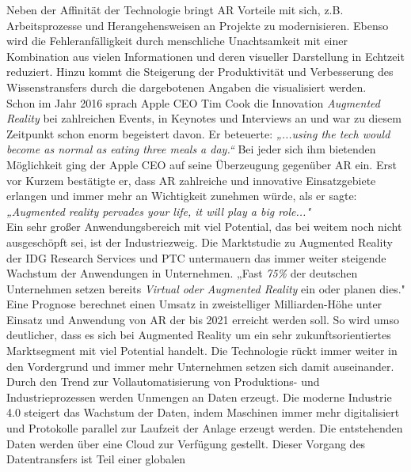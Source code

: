 Neben der Affinität der Technologie bringt \acs{AR} Vorteile mit sich, z.B. Arbeitsprozesse und Herangehensweisen an Projekte zu 
modernisieren. Ebenso wird die Fehleranfälligkeit durch menschliche Unachtsamkeit mit einer Kombination aus vielen Informationen und 
deren visueller Darstellung in Echtzeit reduziert. Hinzu kommt die Steigerung der Produktivität und Verbesserung des Wissenstransfers 
durch die dargebotenen Angaben die visualisiert werden.
\\ 
\linebreak
Schon im Jahr 2016 sprach Apple CEO Tim Cook die Innovation \textit{Augmented Reality} bei zahlreichen Events, in Keynotes und Interviews 
an und war zu diesem Zeitpunkt schon enorm begeistert davon. Er beteuerte: \textit{„...using the tech would become as normal as eating three 
meals a day.“} \cite{timcook2016.2016o} Bei jeder sich ihm bietenden Möglichkeit ging der Apple CEO auf seine Überzeugung gegenüber \acl{AR} ein. 
Erst vor Kurzem bestätigte er, dass \acs{AR} zahlreiche und innovative Einsatzgebiete erlangen und immer mehr an Wichtigkeit zunehmen 
würde, als er sagte: \textit{„Augmented reality pervades your life, it will play a big role..."} \cite{timcook.2020j} 
\\ 
\linebreak
Ein sehr großer Anwendungsbereich mit viel Potential, das bei weitem noch nicht ausgeschöpft sei, ist der Industriezweig. Die 
Marktstudie zu Augmented Reality der IDG Research Services und PTC untermauern das immer weiter steigende Wachstum der Anwendungen in 
Unternehmen. „Fast \textit{75\%} der deutschen Unternehmen setzen bereits \textit{Virtual oder Augmented Reality} ein oder planen dies." 
\cite{studieptc.2020j} Eine Prognose berechnet einen Umsatz in zweistelliger Milliarden-Höhe unter Einsatz und Anwendung von \acs{AR} der 
bis 2021 erreicht werden soll. So wird umso deutlicher, dass es sich bei Augmented Reality um ein sehr zukunftsorientiertes Marktsegment 
mit viel Potential handelt. Die Technologie rückt immer weiter in den Vordergrund und immer mehr Unternehmen setzen sich damit auseinander.
\\ 
\linebreak
Durch den Trend zur Vollautomatisierung von Produktions- und Industrieprozessen werden Unmengen an Daten erzeugt. Die moderne Industrie 4.0 
steigert das Wachstum der Daten, indem Maschinen immer mehr digitalisiert und Protokolle parallel zur Laufzeit der Anlage erzeugt werden. 
Die entstehenden Daten werden über eine Cloud zur Verfügung gestellt. Dieser Vorgang des Datentransfers ist Teil einer globalen 
